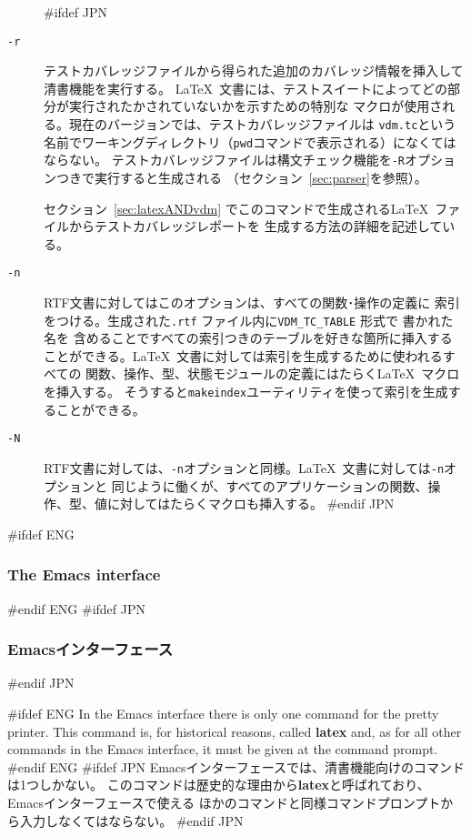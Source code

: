 \documentclass[\pformat,12pt]{article}
\begin{document}
\begin{description}
#ifdef JPN
\item[{\tt -r}]
  テストカバレッジファイルから得られた追加のカバレッジ情報を挿入して清書機能を実行する。
  \LaTeX\ 文書には、テストスイートによってどの部分が実行されたかされていないかを示すための特別な
  マクロが使用される。現在のバージョンでは、テストカバレッジファイルは
  {\tt vdm.tc}という名前でワーキングディレクトリ（\texttt{pwd}コマンドで表示される）になくてはならない。
  テストカバレッジファイルは構文チェック機能を{\tt -R}オプションつきで実行すると生成される
  （セクション~\ref{sec:parser}を参照）。
  
  セクション~\ref{sec:latexANDvdm} でこのコマンドで生成される\LaTeX\ ファイルからテストカバレッジレポートを
  生成する方法の詳細を記述している。

\item[{\tt -n}]
  RTF文書に対してはこのオプションは、すべての関数･操作の定義に
  索引をつける。生成された{\tt .rtf} ファイル内に\texttt{VDM\_TC\_TABLE} 形式で
  書かれた
   名を
  含めることですべての索引つきのテーブルを好きな箇所に挿入する
  ことができる。\LaTeX\ 文書に対しては索引を生成するために使われるすべての
  関数、操作、型、状態モジュールの定義にはたらく\LaTeX\ マクロを挿入する。
  そうすると{\tt makeindex}ユーティリティを使って索引を生成することができる。

\item[{\tt -N}]
  RTF文書に対しては、{\tt -n}オプションと同様。\LaTeX\ 文書に対しては{\tt -n}オプションと
  同じように働くが、すべてのアプリケーションの関数、操作、型、値に対してはたらくマクロも挿入する。
#endif JPN

\end{description}

#ifdef ENG
\subsubsection{The Emacs interface}
#endif ENG
#ifdef JPN
\subsubsection{Emacsインターフェース}
#endif JPN

#ifdef ENG
In the Emacs interface there is only one command for the pretty
printer. This command is, for historical reasons, called \textbf{latex}
and, as for all other commands in the Emacs interface, it must be given at
the command prompt.
#endif ENG
#ifdef JPN
Emacsインターフェースでは、清書機能向けのコマンドは1つしかない。
このコマンドは歴史的な理由から\textbf{latex}と呼ばれており、Emacsインターフェースで使える
ほかのコマンドと同様コマンドプロンプトから入力しなくてはならない。
#endif JPN
\end{document}
